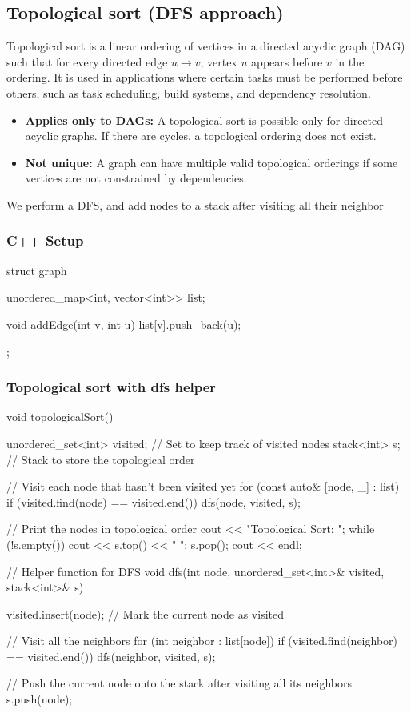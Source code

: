 \documentclass{report}
\begin{document}
\pagebreak 
\subsection{Topological sort (DFS approach)}
\bigbreak \noindent 
Topological sort is a linear ordering of vertices in a directed acyclic graph (DAG) such that for every directed edge $u\to v$, vertex $u$ appears before $v$ in the ordering. It is used in applications where certain tasks must be performed before others, such as task scheduling, build systems, and dependency resolution.
\begin{itemize}
    \item \textbf{Applies only to DAGs:} A topological sort is possible only for directed acyclic graphs. If there are cycles, a topological ordering does not exist.
    \item \textbf{Not unique:} A graph can have multiple valid topological orderings if some vertices are not constrained by dependencies.
\end{itemize}
\bigbreak \noindent 
We perform a DFS, and add nodes to a stack after visiting all their neighbor

\bigbreak \noindent 
\subsubsection{C++ Setup}
\bigbreak \noindent 
\begin{cppcode}
struct graph {
    unordered_map<int, vector<int>> list;

    void addEdge(int v, int u) {
        list[v].push_back(u);
    }
};
\end{cppcode}
\bigbreak \noindent 
\subsubsection{Topological sort with dfs helper}
\bigbreak \noindent 
\begin{cppcode}
    void topologicalSort() {
        unordered_set<int> visited; // Set to keep track of visited nodes
        stack<int> s;               // Stack to store the topological order

        // Visit each node that hasn't been visited yet
        for (const auto& [node, _] : list) {
            if (visited.find(node) == visited.end()) {
                dfs(node, visited, s);
            }
        }

        // Print the nodes in topological order
        cout << "Topological Sort: ";
        while (!s.empty()) {
            cout << s.top() << " ";
            s.pop();
        }
        cout << endl;
    }

    // Helper function for DFS
    void dfs(int node, unordered_set<int>& visited, stack<int>& s) {
        visited.insert(node); // Mark the current node as visited

        // Visit all the neighbors
        for (int neighbor : list[node]) {
            if (visited.find(neighbor) == visited.end()) {
                dfs(neighbor, visited, s);
            }
        }

        // Push the current node onto the stack after visiting all its neighbors
        s.push(node);
    }
\end{cppcode}
\end{document}
